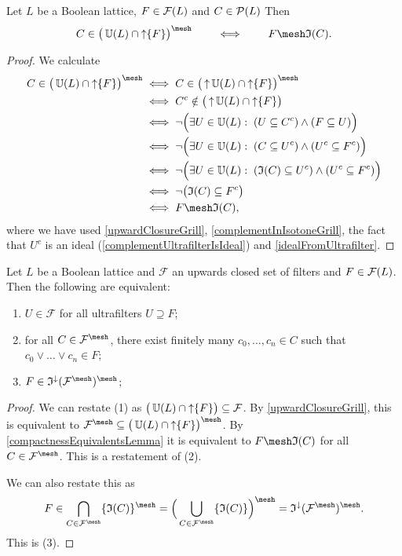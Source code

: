 \begin{lemma} \label{compactnessEquivalentsLemma}
Let $L$ be a Boolean lattice, $F\in \operatorname{\mathcal{F}}(L)$ and $C\in \operatorname{\mathcal{P}}(L)$ Then
\[ C\in \big(\ultrafilters(L) \cap \upset \{F\}\big)^\mesh \qquad\iff\qquad F \mesh \mathfrak{I}(C). \]
\end{lemma}
\begin{proof}
We calculate
\begin{align*}
C\in \big(\ultrafilters(L) \cap \upset \{F\}\big)^\mesh &\iff C\in \big(\upset \ultrafilters(L) \cap \upset \{F\}\big)^\mesh \\
&\iff C^c \notin \big(\upset \ultrafilters(L) \cap \upset \{F\}\big) \\
&\iff \neg \Big(\exists U\in \ultrafilters(L): \; (U\subseteq C^c) \land (F \subseteq U)\Big) \\
&\iff \neg \Big(\exists U\in \ultrafilters(L): \; (C\subseteq U^c) \land (U^c \subseteq F^c)\Big) \\
&\iff \neg \Big(\exists U\in \ultrafilters(L): \; (\mathfrak{I}(C)\subseteq U^c) \land (U^c \subseteq F^c)\Big) \\
&\iff \neg \big(\mathfrak{I}(C) \subseteq F^c\big) \\
&\iff F \mesh \mathfrak{I}(C),
\end{align*}
where we have used \ref{upwardClosureGrill}, \ref{complementInIsotoneGrill}, the fact that $U^c$ is an ideal (\ref{complementUltrafilterIsIdeal}) and \ref{idealFromUltrafilter}.
\end{proof}

\begin{proposition} \label{ChoquetModificationFilterSet}
Let $L$ be a Boolean lattice and $\mathcal{F}$ an upwards closed set of filters and $F\in \operatorname{\mathcal{F}}(L)$. Then the following are equivalent:
\begin{enumerate}
\item $U\in \mathcal{F}$ for all ultrafilters $U\supseteq F$;
\item for all $C\in \mathcal{F}^\mesh$, there exist finitely many $c_0,\ldots, c_n \in C$ such that $c_0 \vee \ldots \vee c_n \in F$;
\item $F\in \mathfrak{I}^\imf(\mathcal{F}^\mesh)^\mesh$;
\end{enumerate}
\end{proposition}
\begin{proof}
We can restate (1) as $\big(\operatorname{\mathbb{U}}(L) \cap \operatorname{\uparrow}\{F\}\big) \subseteq \mathcal{F}$. By \ref{upwardClosureGrill}, this is equivalent to $\mathcal{F}^\mesh \subseteq \big(\ultrafilters(L) \cap \upset\{F\}\big)^\mesh$. By \ref{compactnessEquivalentsLemma} it is equivalent to $F\mesh \mathfrak{I}(C)$ for all $C\in \mathcal{F}^\mesh$. This is a restatement of (2).

We can also restate this as
\[ F \in \bigcap_{C\in \mathcal{F}^\mesh} \{\mathfrak{I}(C)\}^\mesh = \Big(\bigcup_{C\in \mathcal{F}^\mesh}\{\mathfrak{I}(C)\}\Big)^\mesh = \mathfrak{I}^\imf(\mathcal{F}^\mesh)^\mesh. \]
This is (3).
\end{proof}

